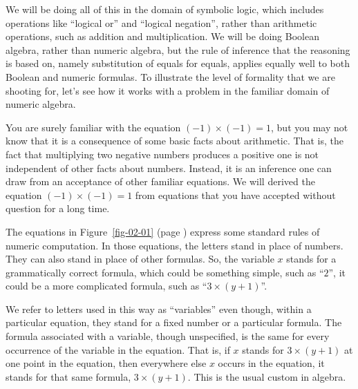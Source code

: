 We will be doing all of this in the domain of symbolic logic, which
includes operations like ``logical or'' and ``logical negation'',
rather than arithmetic operations, such as addition and
multiplication.
We will be doing Boolean algebra, rather than numeric algebra,
but the rule of inference that the reasoning is based on,
namely substitution of equals for equals,
applies equally well to both Boolean and numeric formulas.
To illustrate the level of formality that we are shooting for,
let's see how it works with a problem
in the familiar domain of numeric algebra.

You are surely familiar with the equation $(-1)\times(-1) = 1$, but you may
not know that it is a consequence of some basic facts about
arithmetic.
That is, the fact that multiplying two
negative numbers produces a positive one
is not independent of other facts about numbers.
Instead, it is an inference one can draw
from an acceptance of other familiar equations.
We will derived the equation $(-1)\times(-1) = 1$
from equations that you have accepted without question for a long time.

The equations in Figure~\ref{fig-02-01} (page \pageref{fig-02-01})
express some standard rules of numeric computation.
In those equations, the letters stand in
place of numbers. They can also stand in place of other
formulas.
So, the variable $x$ stands for a grammatically correct formula,
which could be something simple, such as ``$2$'',
it could be a more complicated formula, such as ``$3\times(y + 1)$''.

We refer to letters used in this way as
``variables'' even though, within a particular equation, they
stand for a fixed number or a particular formula.
The formula associated with a variable, though unspecified,
is the same for every occurrence of the variable in the equation.
That is, if $x$ stands for $3\times(y + 1)$ at one point in the
equation, then everywhere else $x$ occurs in the equation,
it stands for that same formula, $3\times(y + 1)$.
This is the usual custom in algebra.

